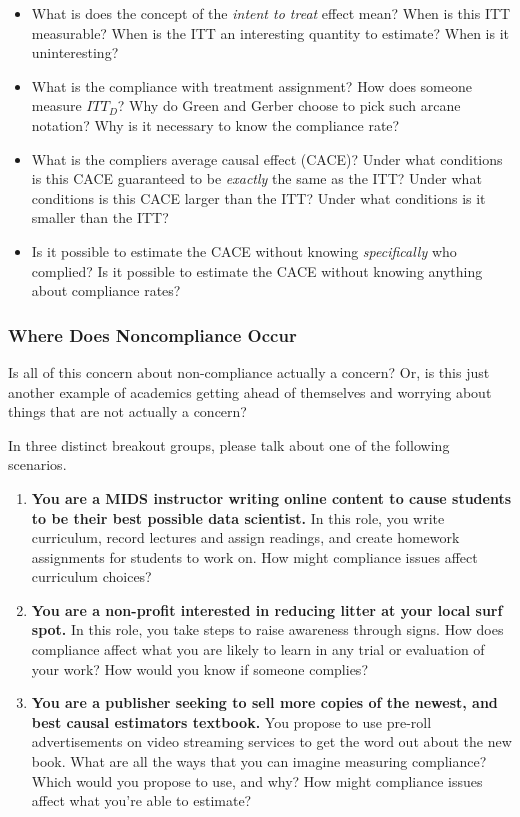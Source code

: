 \documentclass[
]{article}
\providecommand{\tightlist}{%
  \setlength{\itemsep}{0pt}\setlength{\parskip}{0pt}}
\begin{document}
\begin{itemize}
\tightlist
\item
  What is does the concept of the \emph{intent to treat} effect mean? When is this ITT measurable? When is the ITT an interesting quantity to estimate? When is it uninteresting?\\
\item
  What is the compliance with treatment assignment? How does someone measure \(ITT_{D}\)? Why do Green and Gerber choose to pick such arcane notation? Why is it necessary to know the compliance rate?\\
\item
  What is the compliers average causal effect (CACE)? Under what conditions is this CACE guaranteed to be \emph{exactly} the same as the ITT? Under what conditions is this CACE larger than the ITT? Under what conditions is it smaller than the ITT?
\item
  Is it possible to estimate the CACE without knowing \emph{specifically} who complied? Is it possible to estimate the CACE without knowing anything about compliance rates?
\end{itemize}

\hypertarget{where-does-noncompliance-occur}{%
\subsubsection{Where Does Noncompliance Occur}\label{where-does-noncompliance-occur}}

Is all of this concern about non-compliance actually a concern? Or, is this just another example of academics getting ahead of themselves and worrying about things that are not actually a concern?

In three distinct breakout groups, please talk about one of the following scenarios.

\begin{enumerate}
\def\labelenumi{\arabic{enumi}.}
\tightlist
\item
  \textbf{You are a MIDS instructor writing online content to cause students to be their best possible data scientist.} In this role, you write curriculum, record lectures and assign readings, and create homework assignments for students to work on. How might compliance issues affect curriculum choices?
\item
  \textbf{You are a non-profit interested in reducing litter at your local surf spot.} In this role, you take steps to raise awareness through signs. How does compliance affect what you are likely to learn in any trial or evaluation of your work? How would you know if someone complies?
\item
  \textbf{You are a publisher seeking to sell more copies of the newest, and best causal estimators textbook.} You propose to use pre-roll advertisements on video streaming services to get the word out about the new book. What are all the ways that you can imagine measuring compliance? Which would you propose to use, and why? How might compliance issues affect what you're able to estimate?
\end{enumerate}
\end{document}
